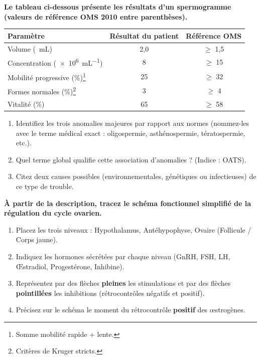 \documentclass[11pt]{article}
\begin{document}
\begin{exercice}
\textbf{Le tableau ci-dessous présente les résultats d'un spermogramme (valeurs de référence OMS 2010 entre parenthèses).}
\begin{center}
\begin{tabular}{|l|c|c|}
\hline
\textbf{Paramètre} & \textbf{Résultat du patient} & \textbf{Référence OMS} \\
\hline
Volume (\SI{}{mL}) & 2,0 & $\ge$ 1,5 \\
\hline
Concentration (\SI{e6}{mL^{-1}}) & 8 & $\ge$ 15 \\
\hline
Mobilité progressive (\%)\footnote{Somme mobilité rapide + lente.} & 25 & $\ge$ 32 \\
\hline
Formes normales (\%)\footnote{Critères de Kruger stricts.} & 3 & $\ge$ 4 \\
\hline
Vitalité (\%) & 65 & $\ge$ 58 \\
\hline
\end{tabular}
\end{center}
\begin{enumerate}
    \item Identifiez les trois anomalies majeures par rapport aux normes (nommez-les avec le terme médical exact : oligospermie, asthénospermie, tératospermie, etc.).
    \item Quel terme global qualifie cette association d'anomalies ? (Indice : OATS).
    \item Citez deux causes possibles (environnementales, génétiques ou infectieuses) de ce type de trouble.
\end{enumerate}
\end{exercice}

\begin{exercice}
\textbf{À partir de la description, tracez le schéma fonctionnel simplifié de la régulation du cycle ovarien.}
\begin{enumerate}
    \item Placez les trois niveaux : Hypothalamus, Antéhypophyse, Ovaire (Follicule / Corps jaune).
    \item Indiquez les hormones sécrétées par chaque niveau (GnRH, FSH, LH, Œstradiol, Progestérone, Inhibine).
    \item Représentez par des flèches \textbf{pleines} les stimulations et par des flèches \textbf{pointillées} les inhibitions (rétrocontrôles négatifs et positif).
    \item Précisez sur le schéma le moment du rétrocontrôle \textbf{positif} des œstrogènes.
\end{enumerate}
\end{exercice}
\end{document}
